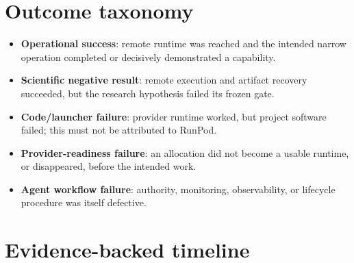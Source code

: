 \documentclass[10pt]{article}
\begin{document}
\section*{Outcome taxonomy}

\begin{itemize}[leftmargin=1.2em]
\item \textbf{Operational success}: remote runtime was reached and the intended
  narrow operation completed or decisively demonstrated a capability.
\item \textbf{Scientific negative result}: remote execution and artifact
  recovery succeeded, but the research hypothesis failed its frozen gate.
\item \textbf{Code/launcher failure}: provider runtime worked, but project
  software failed; this must not be attributed to RunPod.
\item \textbf{Provider-readiness failure}: an allocation did not become a
  usable runtime, or disappeared, before the intended work.
\item \textbf{Agent workflow failure}: authority, monitoring, observability,
  or lifecycle procedure was itself defective.
\end{itemize}

\section*{Evidence-backed timeline}
\end{document}
